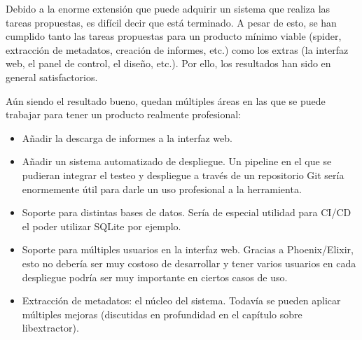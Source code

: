 Debido a la enorme extensión que puede adquirir un sistema que realiza las tareas propuestas, es difícil decir que está terminado. A pesar de esto, se han cumplido tanto las tareas propuestas para un producto mínimo viable (spider, extracción de metadatos, creación de informes, etc.) como los extras (la interfaz web, el panel de control, el diseño, etc.). Por ello, los resultados han sido en general satisfactorios.

Aún siendo el resultado bueno, quedan múltiples áreas en las que se puede trabajar para tener un producto realmente profesional:

\begin{itemize}
  \item Añadir la descarga de informes a la interfaz web.
  \item Añadir un sistema automatizado de despliegue. Un pipeline en el que se pudieran integrar el testeo y despliegue a través de un repositorio Git sería enormemente útil para darle un uso profesional a la herramienta.
  \item Soporte para distintas bases de datos. Sería de especial utilidad para CI/CD el poder utilizar SQLite por ejemplo.
  \item Soporte para múltiples usuarios en la interfaz web. Gracias a Phoenix/Elixir, esto no debería ser muy costoso de desarrollar y tener varios usuarios en cada despliegue podría ser muy importante en ciertos casos de uso.
  \item Extracción de metadatos: el núcleo del sistema. Todavía se pueden aplicar múltiples mejoras (discutidas en profundidad en el capítulo sobre libextractor).
\end{itemize}